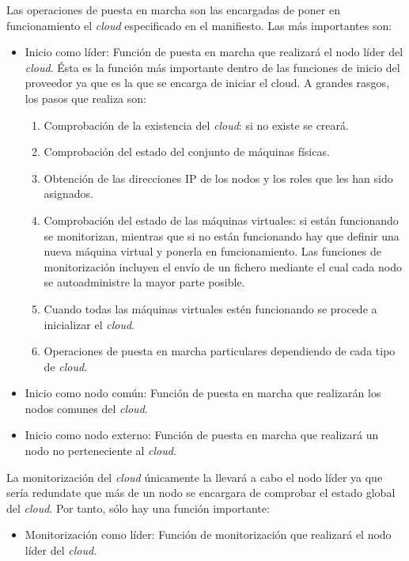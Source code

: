Las operaciones de puesta en marcha son las encargadas de poner en funcionamiento el \emph{cloud} especificado en el manifiesto. Las más importantes son:
\begin{itemize}
\item Inicio como líder: Función de puesta en marcha que realizará el nodo líder del \emph{cloud}. Ésta es la función más importante dentro de las funciones de inicio del proveedor ya que es la que se encarga de iniciar el cloud. A grandes rasgos, los pasos que realiza son:

   \begin{enumerate}
   \item Comprobación de la existencia del \emph{cloud}: si no existe se creará.
   \item Comprobación del estado del conjunto de máquinas físicas.
   \item Obtención de las direcciones IP de los nodos y los roles que les han sido asignados.
   \item Comprobación del estado de las máquinas virtuales: si están funcionando se monitorizan, mientras que si no están funcionando hay que definir una nueva máquina virtual y ponerla en funcionamiento. Las funciones de monitorización incluyen el envío de un fichero mediante el cual cada nodo se autoadministre la mayor parte posible.
   \item Cuando todas las máquinas virtuales estén funcionando se procede a inicializar el \emph{cloud}.
   \item Operaciones de puesta en marcha particulares dependiendo de cada tipo de \emph{cloud}.
   \end{enumerate}

\item Inicio como nodo común: Función de puesta en marcha que realizarán los nodos comunes del \emph{cloud}.
\item Inicio como nodo externo: Función de puesta en marcha que realizará un nodo no perteneciente al \emph{cloud}.
\end{itemize}

La monitorización del \emph{cloud} únicamente la llevará a cabo el nodo líder ya que sería redundate que más de un nodo se encargara de comprobar el estado global del \emph{cloud}. Por tanto, sólo hay una función importante:
\begin{itemize}
\item Monitorización como líder: Función de monitorización que realizará el nodo líder del \emph{cloud}.
\end{itemize}

